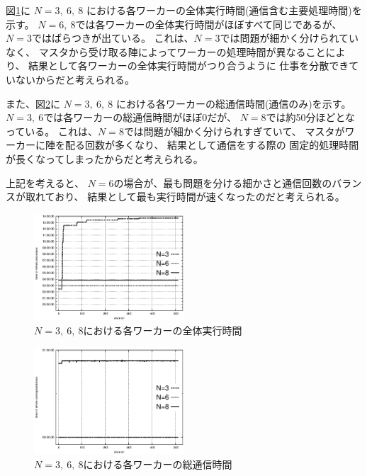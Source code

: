 図\ref{pic:time4all-process}に
$N=3, \ 6, \ 8$
における各ワーカーの全体実行時間(通信含む主要処理時間)を示す。
$N=6, \  8$では各ワーカーの全体実行時間がほぼすべて同じであるが、
$N=3$ではばらつきが出ている。
これは、$N=3$では問題が細かく分けられていなく、
マスタから受け取る陣によってワーカーの処理時間が異なることにより、
結果として各ワーカーの全体実行時間がつり合うように
仕事を分散できていないからだと考えられる。

また、図\ref{pic:time4all-only-correspondence}に
$N=3, \ 6, \ 8$
における各ワーカーの総通信時間(通信のみ)を示す。
$N=3, \ 6$では各ワーカーの総通信時間がほぼ0だが、
$N=8$では約50分ほどとなっている。
これは、$N=8$では問題が細かく分けられすぎていて、
マスタがワーカーに陣を配る回数が多くなり、
結果として通信をする際の
固定的処理時間が長くなってしまったからだと考えられる。

上記を考えると、
$N=6$の場合が、最も問題を分ける細かさと通信回数のバランスが取れており、
結果として最も実行時間が速くなったのだと考えられる。

\begin{figure}[!htb]
		\centering
\includegraphics[width=0.5\textwidth]{exp4-2-tie.eps}
		\caption{$N=3, \ 6, \ 8$における各ワーカーの全体実行時間}
		\label{pic:time4all-process}
\end{figure}
\begin{figure}[!htb]
		\centering
\includegraphics[width=0.5\textwidth]{exp4-2-tic.eps}
		\caption{$N=3, \ 6, \ 8$における各ワーカーの総通信時間}
		\label{pic:time4all-only-correspondence}
\end{figure}
